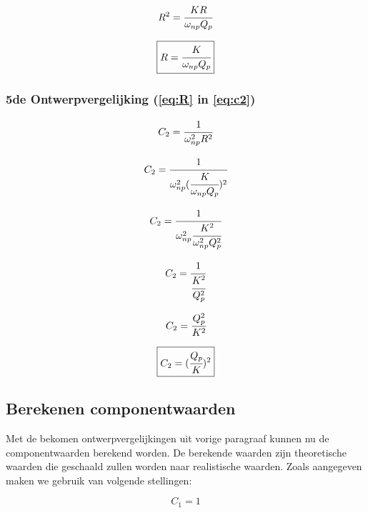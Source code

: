 \documentclass[]{article}
\begin{document}
\begin{equation*}
R^{2} = \cfrac{KR}{\omega_{np}Q_{p}}
\end{equation*}

\begin{equation} \label{eq:R}
\boxed{R = \cfrac{K}{\omega_{np}Q_{p}}}
\end{equation}

\subsubsection*{5de Ontwerpvergelijking (\ref{eq:R} in \ref{eq:c2})}

\begin{equation*}
C_{2} = \cfrac{1}{\omega_{np}^{2}R^{2}}
\end{equation*}

\begin{equation*}
C_{2} = \cfrac{1}{\omega_{np}^{2}(\cfrac{K}{\omega_{np}Q_{p}})^{2}}
\end{equation*}

\begin{equation*}
C_{2} = \cfrac{1}{\omega_{np}^{2}\cfrac{K^{2}}{\omega_{np}^{2}Q_{p}^{2}}}
\end{equation*}

\begin{equation*}
C_{2} = \cfrac{1}{\cfrac{K^{2}}{Q_{p}^{2}}}
\end{equation*}

\begin{equation*}
C_{2} = \cfrac{Q_{p}^{2}}{K^{2}}
\end{equation*}

\begin{equation}
\boxed{C_{2} = (\cfrac{Q_{p}}{K})^{2}}
\end{equation}

\newpage

\subsection*{Berekenen componentwaarden}

Met de bekomen ontwerpvergelijkingen uit vorige paragraaf kunnen nu de componentwaarden berekend worden. De berekende waarden zijn theoretische waarden die geschaald zullen worden naar realistische waarden. Zoals aangegeven maken we gebruik van volgende stellingen:

\begin{equation*}
C_{1} = 1
\end{equation*}
\end{document}
